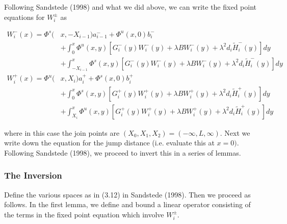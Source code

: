 \documentclass[12pt]{article}
\begin{document}
Following Sandstede (1998) and what we did above, we can write the fixed point equations for $W_i^\pm$ as

\begin{align*}
W_i^-(x) = \Phi^s(&x, -X_{i-1})a_{i-1}^- + \Phi^u(x, 0)b_i^- \\
&+ \int_0^x \Phi^u(x, y)[G_i^-(y) W_i^-(y) + \lambda B W_i^-(y) + \lambda^2 d_i \tilde{H}_i^-(y) ] dy \\
&+ \int_{-X_{i-1}}^x \Phi^s(x, y)[G_i^-(y) W_i^-(y) + \lambda B W_i^-(y) + \lambda^2 d_i \tilde{H}_i^-(y) ] dy \\
W_i^+(x) = \Phi^u(&x, X_i)a_i^+ + \Phi^s(x, 0)b_i^+ \\
&+ \int_0^x \Phi^s(x, y)[G_i^+(y) W_i^+(y) + \lambda B W_i^+(y) + \lambda^2 d_i \tilde{H}_i^+(y)] dy \\
&+ \int_{X_i}^x \Phi^u(x, y)[G_i^+(y) W_i^+(y) + \lambda B W_i^+(y) + \lambda^2 d_i \tilde{H}_i^+(y)]dy
\end{align*}

where in this case the join points are $(X_0, X_1, X_2) = (-\infty, L, \infty)$. Next we write down the equation for the jump distance (i.e. evaluate this at $x = 0)$. \\

Following Sandstede (1998), we proceed to invert this in a series of lemmas. 

\subsubsection*{The Inversion}

Define the various spaces as in (3.12) in Sandstede (1998). Then we proceed as follows. In the first lemma, we define and bound a linear operator consisting of the terms in the fixed point equation which involve $W_i^\pm$.
\end{document}
